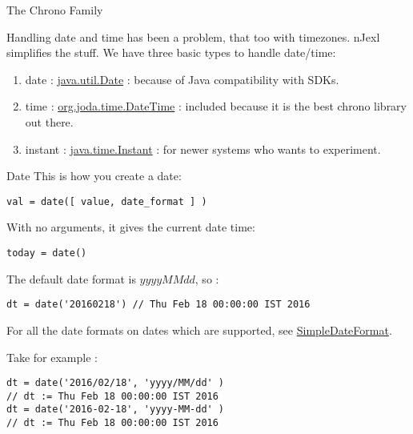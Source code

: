 \begin{section}{The Chrono Family}

Handling date and time has been a problem, that too with timezones.
nJexl simplifies the stuff. 
We have three basic types to handle date/time:
\begin{enumerate}
\item{date : 
\href{https://docs.oracle.com/javase/8/docs/api/java/util/Date.html}{java.util.Date} : because of Java compatibility with SDKs. }
\item{time : 
\href{http://www.joda.org/joda-time/apidocs/org/joda/time/DateTime.html}{org.joda.time.DateTime} : included because it is the best chrono library out there. }
\item{instant : 
\href{https://docs.oracle.com/javase/8/docs/api/java/time/Instant.html}{java.time.Instant} : for newer systems who wants to experiment. }
\end{enumerate}


\begin{subsection}{Date}
This is how you create a date:
\begin{lstlisting}[style=JexlStyle]
val = date([ value, date_format ] )
\end{lstlisting}

With no arguments, it gives the current date time:

\begin{lstlisting}[style=JexlStyle]
today = date()
\end{lstlisting}

The default date format is $yyyyMMdd$, so :
\begin{lstlisting}[style=JexlStyle]
dt = date('20160218') // Thu Feb 18 00:00:00 IST 2016
\end{lstlisting}

For all the date formats on dates which are supported, 
see \href{https://docs.oracle.com/javase/8/docs/api/java/text/SimpleDateFormat.html}{SimpleDateFormat}.

Take for example :

\begin{lstlisting}[style=JexlStyle]
dt = date('2016/02/18', 'yyyy/MM/dd' ) 
// dt := Thu Feb 18 00:00:00 IST 2016
dt = date('2016-02-18', 'yyyy-MM-dd' ) 
// dt := Thu Feb 18 00:00:00 IST 2016
\end{lstlisting}

\end{subsection}


\end{section}
